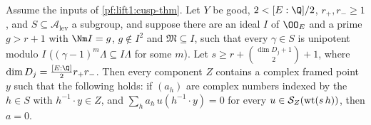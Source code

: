 \begin{proposition}\label{pf:lift1:sep}
Assume the inputs of \cref{pf:lift1:cusp-thm}. Let $Y$ be good, $2<[E:\Q]/2$, $r_+,r_-\ge1$, and
$S\subseteq\mathcal A_{\mathrm{lev}}$ a subgroup, and suppose there are an ideal $I$ of $\OO_E$ and a prime
$g>r+1$ with $\Nm I=g$, $g\notin I^2$ and $\mathfrak M\subseteq I$, such that every $\gamma\in S$ is
unipotent modulo $I$ ($(\gamma-1)^m\Lambda\subseteq I\Lambda$ for some $m$). Let
$s\ge r+\binom{\dim D_j+1}2+1$, where $\dim D_j=\frac{[E:\Q]}2r_+r_-$. Then every component $Z$ contains a
complex framed point $y$ such that the following holds: if $(a_h)$ are complex numbers indexed by the
$h\in S$ with $h^{-1}\cdot y\in Z$, and $\sum_ha_h\,u(h^{-1}\cdot y)=0$ for every
$u\in\mathcal S_Z(\mathrm{wt}(s\,h))$, then $a=0$.
\end{proposition}

